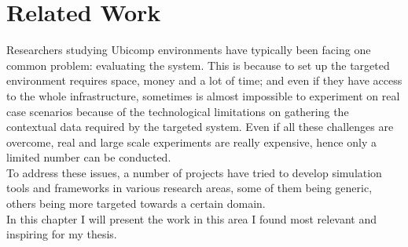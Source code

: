 \chapter{Related Work}\label{ch:related_work}

Researchers studying Ubicomp environments have typically been facing one common problem: evaluating the system. This is because to set up the targeted environment requires space, money and a lot of time; and even if they have access to the whole infrastructure, sometimes is almost impossible to experiment on real case scenarios because of the technological limitations on gathering the contextual data required by the targeted system. Even if all these challenges are overcome, real and large scale experiments are really expensive, hence only a limited number can be conducted.\\

To address these issues, a number of projects have tried to develop simulation tools and frameworks in various research areas, some of them being generic, others being more targeted towards a certain domain.\\

In this chapter I will present the work in this area I found most relevant and inspiring for my thesis.

% 











